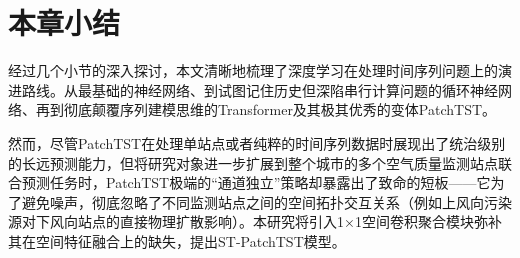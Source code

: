 \section{本章小结}

经过几个小节的深入探讨，本文清晰地梳理了深度学习在处理时间序列问题上的演进路线。从最基础的神经网络、到试图记住历史但深陷串行计算问题的循环神经网络、再到彻底颠覆序列建模思维的Transformer及其极其优秀的变体PatchTST。

然而，尽管PatchTST在处理单站点或者纯粹的时间序列数据时展现出了统治级别的长远预测能力，但将研究对象进一步扩展到整个城市的多个空气质量监测站点联合预测任务时，PatchTST极端的“通道独立”策略却暴露出了致命的短板——它为了避免噪声，彻底忽略了不同监测站点之间的空间拓扑交互关系（例如上风向污染源对下风向站点的直接物理扩散影响）。本研究将引入1×1空间卷积聚合模块弥补其在空间特征融合上的缺失，提出ST-PatchTST模型。